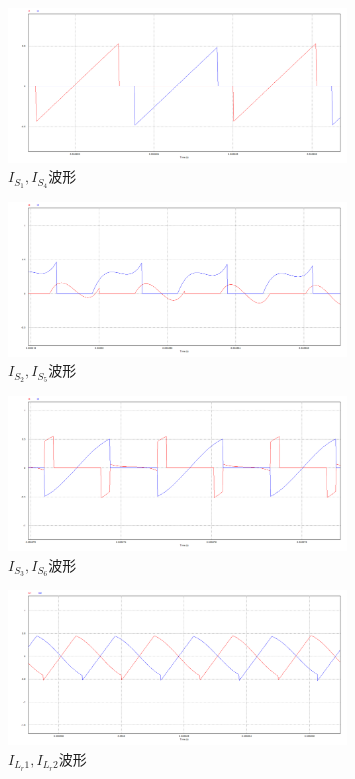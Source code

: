 \documentclass[12pt,a4paper]{report}
\begin{document}
\begin{figure}[h]
    \centering
    \includegraphics[width = 0.8\textwidth]{figures/sim_is1,is4.png}
    \caption{$I_{S_1},I_{S_4}$波形}
\end{figure}

\begin{figure}[h]
    \centering
    \includegraphics[width = 0.8\textwidth]{figures/sim_is2,is5.png}
    \caption{$I_{S_2},I_{S_5}$波形}
\end{figure}

\begin{figure}[h]
    \centering
    \includegraphics[width = 0.8\textwidth]{figures/sim_is3,is6.png}
    \caption{$I_{S_3},I_{S_6}$波形}
\end{figure}

\begin{figure}[h]
    \centering
    \includegraphics[width = 0.8\textwidth]{figures/sim_ilr1,ilr2.png}
    \caption{$I_{L_r1},I_{L_r2}$波形}
\end{figure}
\end{document}
